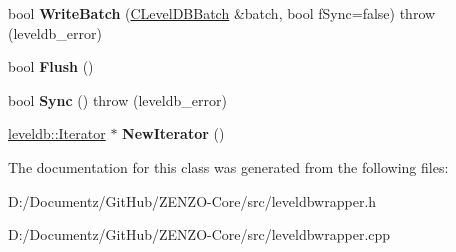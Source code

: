 \begin{DoxyCompactItemize}
\item 
\mbox{\label{class_c_level_d_b_wrapper_a820484c9e427f9e3400396e750acf4b8}} 
bool {\bfseries Write\+Batch} (\mbox{\hyperlink{class_c_level_d_b_batch}{C\+Level\+D\+B\+Batch}} \&batch, bool f\+Sync=false)  throw (leveldb\+\_\+error)
\item 
\mbox{\label{class_c_level_d_b_wrapper_a639fbfd6652941a1ab570c202197a32a}} 
bool {\bfseries Flush} ()
\item 
\mbox{\label{class_c_level_d_b_wrapper_abd05e914893cd610e8444871f829d8c9}} 
bool {\bfseries Sync} ()  throw (leveldb\+\_\+error)
\item 
\mbox{\label{class_c_level_d_b_wrapper_a5f43d01a8a6b26464b875d190e002d74}} 
\mbox{\hyperlink{classleveldb_1_1_iterator}{leveldb\+::\+Iterator}} $\ast$ {\bfseries New\+Iterator} ()
\end{DoxyCompactItemize}


The documentation for this class was generated from the following files\+:\begin{DoxyCompactItemize}
\item 
D\+:/\+Documentz/\+Git\+Hub/\+Z\+E\+N\+Z\+O-\/\+Core/src/leveldbwrapper.\+h\item 
D\+:/\+Documentz/\+Git\+Hub/\+Z\+E\+N\+Z\+O-\/\+Core/src/leveldbwrapper.\+cpp\end{DoxyCompactItemize}
